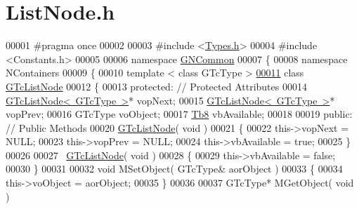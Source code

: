 \hypertarget{_list_node_8h_source}{}\section{List\+Node.\+h}
\label{_list_node_8h_source}

\begin{DoxyCode}
00001 \textcolor{preprocessor}{#pragma once}
00002 
00003 \textcolor{preprocessor}{#include <\mbox{\hyperlink{_types_8h}{Types.h}}>}
00004 \textcolor{preprocessor}{#include <Constants.h>}
00005 
00006 \textcolor{keyword}{namespace }\mbox{\hyperlink{namespace_g_n_common}{GNCommon}}
00007 \{
00008    \textcolor{keyword}{namespace }NContainers
00009    \{
00010       \textcolor{keyword}{template} < \textcolor{keyword}{class} GTcType >
\mbox{\hyperlink{class_g_n_common_1_1_n_containers_1_1_g_tc_list_node}{00011}}       \textcolor{keyword}{class }\mbox{\hyperlink{class_g_n_common_1_1_n_containers_1_1_g_tc_list_node}{GTcListNode}}
00012       \{
00013       \textcolor{keyword}{protected}:     \textcolor{comment}{// Protected Attributes}
00014          \mbox{\hyperlink{class_g_n_common_1_1_n_containers_1_1_g_tc_list_node}{GTcListNode< GTcType >}}* vopNext;
00015          \mbox{\hyperlink{class_g_n_common_1_1_n_containers_1_1_g_tc_list_node}{GTcListNode< GTcType >}}* vopPrev;
00016          GTcType                 voObject;
00017          \mbox{\hyperlink{namespace_g_n_common_a8115dc7ed53b6e5b52e6bfde1632ea74}{Tb8}}                    vbAvailable;
00018 
00019       \textcolor{keyword}{public}:        \textcolor{comment}{// Public Methods}
00020          \mbox{\hyperlink{class_g_n_common_1_1_n_containers_1_1_g_tc_list_node}{GTcListNode}}( \textcolor{keywordtype}{void} )
00021          \{
00022             this->vopNext = NULL;
00023             this->vopPrev = NULL;
00024             this->vbAvailable = \textcolor{keyword}{true};
00025          \}
00026 
00027          ~\mbox{\hyperlink{class_g_n_common_1_1_n_containers_1_1_g_tc_list_node}{GTcListNode}}( \textcolor{keywordtype}{void} )
00028          \{
00029             this->vbAvailable = \textcolor{keyword}{false};
00030          \}
00031 
00032          \textcolor{keywordtype}{void} MSetObject( GTcType& aorObject )
00033          \{
00034             this->voObject = aorObject;
00035          \}
00036 
00037          GTcType* MGetObject( \textcolor{keywordtype}{void} )

\end{DoxyCode}
